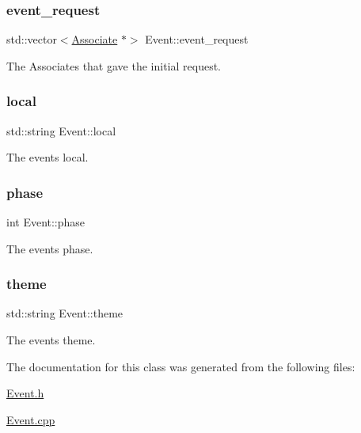 \subsubsection{\texorpdfstring{event\+\_\+request}{event\_request}}
{\footnotesize\ttfamily std\+::vector$<$\mbox{\hyperlink{classAssociate}{Associate}} $\ast$$>$ Event\+::event\+\_\+request\hspace{0.3cm}{\ttfamily [protected]}}



The Associates that gave the initial request. 

\mbox{\label{classEvent_a3d1f28a3bde9ab718d5b0003f8ab5129}} 
\subsubsection{\texorpdfstring{local}{local}}
{\footnotesize\ttfamily std\+::string Event\+::local\hspace{0.3cm}{\ttfamily [protected]}}



The event\textquotesingle{}s local. 

\mbox{\label{classEvent_a4059db56458a92ddb5bd1d1443631b02}} 
\subsubsection{\texorpdfstring{phase}{phase}}
{\footnotesize\ttfamily int Event\+::phase\hspace{0.3cm}{\ttfamily [protected]}}



The event\textquotesingle{}s phase. 

\mbox{\label{classEvent_aa9cc4378d5cecaadc8e6de92b313e6f8}} 
\subsubsection{\texorpdfstring{theme}{theme}}
{\footnotesize\ttfamily std\+::string Event\+::theme\hspace{0.3cm}{\ttfamily [protected]}}



The event\textquotesingle{}s theme. 



The documentation for this class was generated from the following files\+:\begin{DoxyCompactItemize}
\item 
\mbox{\hyperlink{Event_8h}{Event.\+h}}\item 
\mbox{\hyperlink{Event_8cpp}{Event.\+cpp}}\end{DoxyCompactItemize}
